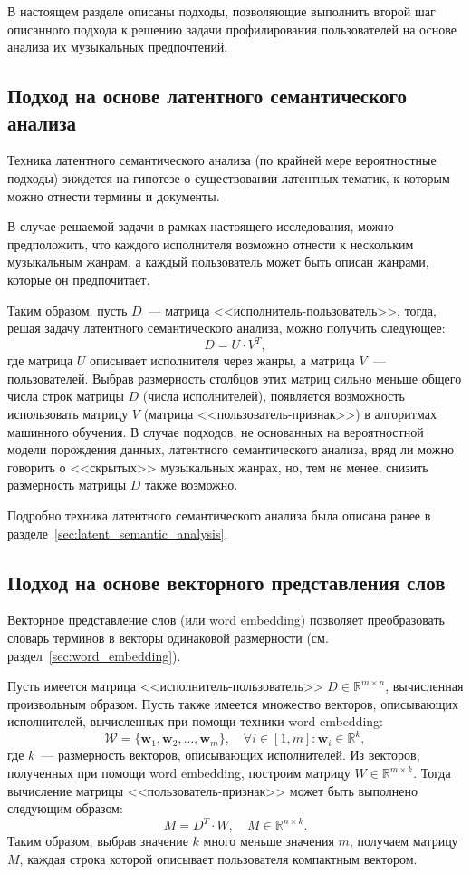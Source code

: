 В настоящем разделе описаны подходы, позволяющие выполнить
второй шаг описанного подхода к решению задачи профилирования
пользователей на основе анализа их музыкальных предпочтений.

\subsection{Подход на основе латентного семантического анализа}

Техника латентного семантического анализа (по крайней мере
вероятностные подходы) зиждется на гипотезе о существовании
латентных тематик, к которым можно отнести термины и документы.

В случае решаемой задачи в рамках настоящего исследования,
можно предположить, что каждого исполнителя возможно отнести
к нескольким музыкальным жанрам, а каждый пользователь может быть
описан жанрами, которые он предпочитает.

Таким образом, пусть $D$~--- матрица <<исполнитель-пользователь>>,
тогда, решая задачу латентного семантического анализа, можно
получить следующее:
\[
    D = U \cdot V^T,
\]
где матрица $U$ описывает исполнителя через жанры, а матрица
$V$~--- пользователей. Выбрав размерность столбцов этих
матриц сильно меньше общего числа строк матрицы $D$ (числа
исполнителей), появляется возможность использовать матрицу $V$
(матрица <<пользователь-признак>>) в алгоритмах машинного обучения.  
В случае подходов, не основанных на вероятностной модели порождения
данных, латентного семантического анализа, вряд ли можно говорить о
<<скрытых>> музыкальных жанрах, но, тем не менее, снизить размерность
матрицы $D$ также возможно.

Подробно техника латентного семантического анализа была описана
ранее в разделе~\ref{sec:latent_semantic_analysis}.

\subsection{Подход на основе векторного представления слов}
\label{ssec:docs_word_embedding}

Векторное представление слов (или word embedding) позволяет
преобразовать словарь терминов в векторы одинаковой размерности
(см. раздел~\ref{sec:word_embedding}). 

Пусть имеется матрица <<исполнитель-пользователь>>
$D \in \mathbb{R}^{m \times n}$, вычисленная произвольным
образом. Пусть также имеется множество векторов,
описывающих исполнителей, вычисленных при помощи техники
word embedding: 
\[
    \mathcal{W} = \{\bm{w}_1, \bm{w}_2,..., \bm{w}_m\},\quad
    \forall i \in [1, m] \colon \bm{w}_i \in \mathbb{R}^k,
\]
где $k$~--- размерность векторов, описывающих исполнителей.
Из векторов, полученных при помощи word embedding, построим
матрицу $W \in \mathbb{R}^{m \times k}$. Тогда вычисление матрицы
<<пользователь-признак>> может быть выполнено следующим образом:
\[
    M = D^T \cdot W,\quad M \in \mathbb{R}^{n \times k}.
\]
Таким образом, выбрав значение $k$ много меньше значения $m$,
получаем матрицу $M$, каждая строка которой описывает
пользователя компактным вектором.

